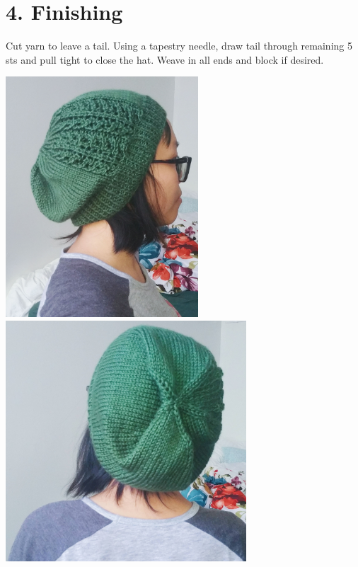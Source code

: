 \documentclass[12pt]{article}
\begin{document}
\section*{4. Finishing}

Cut yarn to leave a tail. Using a tapestry needle, draw tail through remaining 5 sts and pull tight to close the hat. Weave in all ends and block if desired. \vspace{1em}

\centering
\includegraphics[height=9cm]{sideview.jpg} \hspace{1em}
\includegraphics[height=9cm]{decreases.jpg}
\end{document}
